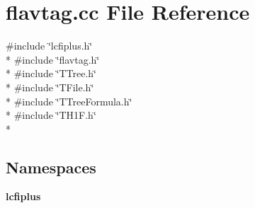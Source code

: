 \section{flavtag.\-cc File Reference}
\label{flavtag_8cc}
{\ttfamily \#include \char`\"{}lcfiplus.\-h\char`\"{}}\\*
{\ttfamily \#include \char`\"{}flavtag.\-h\char`\"{}}\\*
{\ttfamily \#include \char`\"{}T\-Tree.\-h\char`\"{}}\\*
{\ttfamily \#include \char`\"{}T\-File.\-h\char`\"{}}\\*
{\ttfamily \#include \char`\"{}T\-Tree\-Formula.\-h\char`\"{}}\\*
{\ttfamily \#include \char`\"{}T\-H1\-F.\-h\char`\"{}}\\*
\subsection*{Namespaces}
\begin{DoxyCompactItemize}
\item 
{\bf lcfiplus}
\end{DoxyCompactItemize}
